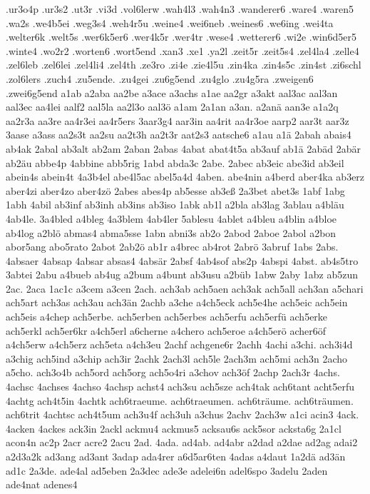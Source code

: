 {.ur3o4p
.ur3s2
.ut3r
.vi3d
.vol6lerw
.wah4l3
.wah4n3
.wanderer6
.ware4
.waren5
.wa2s
.we4b5ei
.weg3s4
.weh4r5u
.weine4
.wei6neb
.weines6
.we6ing
.wei4ta
.welter6k
.welt5s
.wer6k5er6
.wer4k5r
.wer4tr
.wese4
.wetterer6
.wi2e
.win6d5er5
.winte4
.wo2r2
.worten6
.wort5end
.xan3
.xe1
.ya2l
.zeit5r
.zeit5s4
.zel4la4
.zelle4
.zel6leb
.zel6lei
.zel4li4
.zel4th
.ze3ro
.zi4e
.zie4l5u
.zin4ka
.zin4s5c
.zin4st
.zi6schl
.zol6lers
.zuch4
.zu5ende.
.zu4gei
.zu6g5end
.zu4glo
.zu4g5ra
.zweigen6
.zwei6g5end
a1ab
a2aba
aa2be
a3ace
a3achs
a1ae
aa2gr
a3akt
aal3ac
aal3an
aal3ec
aa4lei
aalf2
aal5la
aa2l3o
aal3ö
a1am
2a1an
a3an.
a2anä
aan3e
a1a2q
aa2r3a
aa3re
aa4r3ei
aa4r5ers
3aar3g4
aar3in
aa4rit
aa4r3oe
aarp2
aar3t
aar3z
3aase
a3ass
aa2s3t
aa2su
aa2t3h
aa2t3r
aat2s3
aatsche6
a1au
a1ä
2abah
abais4
ab4ak
2abal
ab3alt
ab2am
2aban
2abas
4abat
abat4t5a
ab3auf
ab1ä
2abäd
2abär
ab2äu
abbe4p
4abbine
abb5rig
1abd
abda3c
2abe.
2abec
ab3eic
abe3id
ab3eil
abein4s
abein4t
4a3b4el
abe4l5ac
abel5a4d
4aben.
abe4nin
a4berd
aber4ka
ab3erz
aber4zi
aber4zo
aber4zö
2abes
abes4p
ab5esse
ab3eß
2a3bet
abet3s
1abf
1abg
1abh
4abil
ab3inf
ab3inh
ab3ins
ab3iso
1abk
ab1l
a2bla
ab3lag
3ablau
a4bläu
4ab4le.
3a4bled
a4bleg
4a3blem
4ab4ler
5ablesu
4ablet
a4bleu
a4blin
a4bloe
ab4log
a2blö
abmas4
abma5sse
1abn
abni3s
ab2o
2abod
2aboe
2abol
a2bon
abor5ang
abo5rato
2abot
2ab2ö
ab1r
a4brec
ab4rot
2abrö
3abruf
1abs
2abs.
4absaer
4absap
4absar
absas4
4absär
2absf
4ab4sof
abs2p
4abspi
4abst.
ab4s5tro
3abtei
2abu
a4bueb
ab4ug
a2bum
a4bunt
ab3usu
a2büb
1abw
2aby
1abz
ab5zun
2ac.
2aca
1ac1c
a3cem
a3cen
2ach.
ach3ab
ach5aen
ach3ak
ach5all
ach3an
a5chari
ach5art
ach3as
ach3au
ach3än
2achb
a3che
a4ch5eck
ach5e4he
ach5eic
ach5ein
ach5eis
a4chep
ach5erbe.
ach5erben
ach5erbes
ach5erfu
ach5erfü
ach5erke
ach5erkl
ach5er6kr
a4ch5erl
a6cherne
a4chero
ach5eroe
a4ch5erö
acher6öf
a4ch5erw
a4ch5erz
ach5eta
a4ch3eu
2achf
achgene6r
2achh
4achi
a3chi.
ach3i4d
a3chig
ach5ind
a3chip
ach3ir
2achk
2ach3l
ach5le
2ach3m
ach5mi
ach3n
2acho
a5cho.
ach3o4b
ach5ord
ach5org
ach5o4ri
a3chov
ach3öf
2achp
2ach3r
4achs.
4achsc
4achses
4achso
4achsp
achst4
ach3su
ach5sze
ach4tak
ach6tant
acht5erfu
4achtg
ach4t5in
4achtk
ach6traeume.
ach6traeumen.
ach6träume.
ach6träumen.
ach6trit
4achtsc
ach4t5um
ach3u4f
ach3uh
a3chus
2achv
2ach3w
a1ci
acin3
4ack.
4acken
4ackes
ack3in
2ackl
ackmu4
ackmus5
acksau6s
ack5sor
acksta6g
2a1cl
acon4n
ac2p
2acr
acre2
2acu
2ad.
4ada.
ad4ab.
ad4abr
a2dad
a2dae
ad2ag
adai2
a2d3a2k
ad3ang
ad3ant
3adap
ada4rer
a6d5ar6ten
4adas
a4daut
1a2dä
ad3än
ad1c
2a3de.
ade4al
ad5eben
2a3dec
ade3e
adelei6n
adel6spo
3adelu
2aden
ade4nat
adenes4
}

